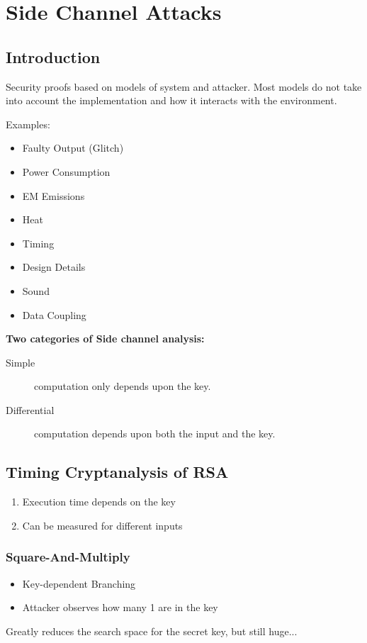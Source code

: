 
\section{Side Channel Attacks}
\subsection{Introduction}
Security proofs based on models of system and attacker. Most models do not take
into account the implementation and how it interacts with the environment.

Examples:
\begin{itemize}
  \item Faulty Output (Glitch)
  \item Power Consumption
  \item EM Emissions
  \item Heat
  \item Timing
  \item Design Details
  \item Sound
  \item Data Coupling
\end{itemize}

\textbf{Two categories of Side channel analysis:}
\begin{description}
  \item[Simple] computation only depends upon the key.
  \item[Differential] computation depends upon both the input and the key.
\end{description}

\subsection{Timing Cryptanalysis of RSA}
\begin{enumerate}
  \item Execution time depends on the key
  \item Can be measured for different inputs
\end{enumerate}


\subsubsection{Square-And-Multiply}

\begin{itemize}
  \item Key-dependent Branching
  \item Attacker observes how many 1 are in the key
\end{itemize}
Greatly reduces the search space for the secret key, but still huge...

